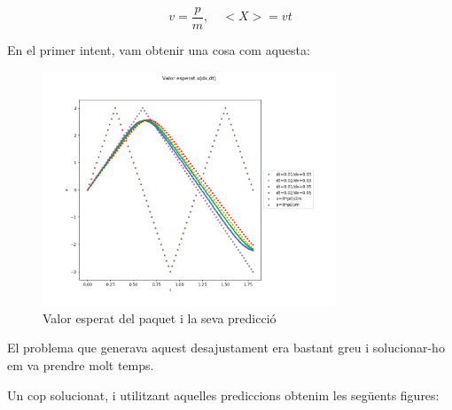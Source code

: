 \documentclass{article}
\begin{document}
\begin{equation}
v=\frac{p}{m}, \quad <X>=vt 
\end{equation}

En el primer intent, vam obtenir una cosa com aquesta:

\begin{figure}[H]
	\includegraphics[width=\textwidth,height=7cm]{xespxmalament.png}
	\caption{Valor esperat del paquet i la seva predicció}
\end{figure}

El problema que generava aquest desajustament era bastant greu i solucionar-ho em va prendre molt temps.

Un cop solucionat, i utilitzant aquelles prediccions obtenim les següents figures:
\end{document}
